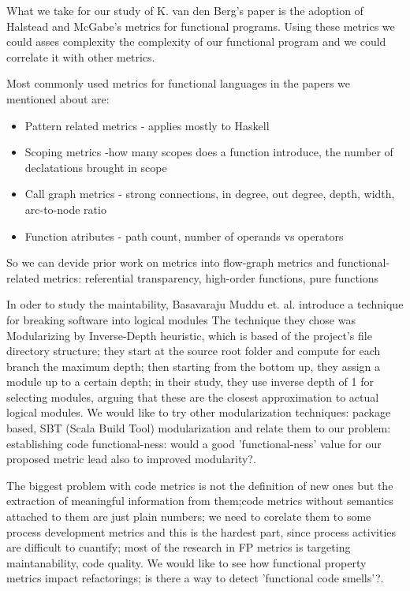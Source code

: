 \documentclass{article}
\begin{document}
What we take for our study of  K. van den Berg's paper is the adoption of Halstead and McGabe's metrics for functional programs. Using these metrics we could asses complexity the complexity of our functional program and we could correlate it with other metrics. 


\newpage

Most commonly used metrics for functional languages in the papers we mentioned about are:

\begin{itemize}
\item Pattern related metrics - applies mostly to Haskell
\item Scoping metrics -how many scopes does a function introduce, the number of declatations brought in scope
\item Call graph metrics - strong connections, in degree, out degree, depth, width, arc-to-node ratio
\item Function atributes - path count, number of operands vs operators
\end{itemize}

So we can devide prior work on metrics into flow-graph metrics and functional-related metrics: referential transparency, high-order functions, pure functions\cite{DBLP:conf/icse/MudduABP13} \par


In oder to study the maintability, Basavaraju Muddu et. al. introduce a technique for breaking software into logical modules \cite{DBLP:conf/icse/MudduABP13} The technique they chose was Modularizing by  Inverse-Depth heuristic, which is based of the project's file directory structure; they start at the source root folder and compute for each branch the maximum depth; then starting from the bottom up, they assign a module up to a certain depth; in their study, they use inverse depth of 1 for selecting modules, arguing that these are the closest approximation to actual logical modules. We would like to try other modularization techniques: package based, SBT (Scala Build Tool)  modularization and relate them to our problem: establishing code functional-ness: would a good 'functional-ness' value for our proposed metric lead also to improved modularity?.\par

The biggest problem with code metrics is not the definition of new ones but the extraction of  meaningful information from them;code metrics without semantics attached to them are just plain numbers; we need to corelate them to some process development metrics and this is the hardest part, since process activities are difficult to cuantify; most of the research in FP metrics is targeting maintanability, code quality. We would like to see how functional property metrics impact refactorings; is there a way to detect 'functional code smells'?.  \par
\end{document}
